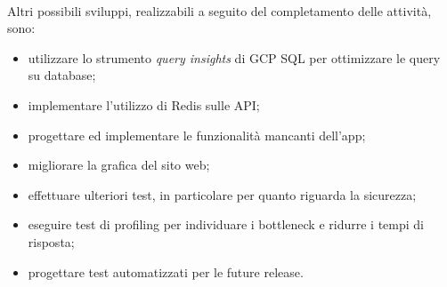 \documentclass[12pt,a4paper,twoside,english,italian]{book}
\begin{document}
\paragraph{} Altri possibili sviluppi, realizzabili a seguito del completamento delle attività, sono:
\begin{itemize}
    \item utilizzare lo strumento \emph{query insights} di GCP SQL per ottimizzare le query su database;
    \item implementare l'utilizzo di Redis sulle API;
    \item progettare ed implementare le funzionalità mancanti dell'app;
    \item migliorare la grafica del sito web;
    \item effettuare ulteriori test, in particolare per quanto riguarda la sicurezza;
    \item eseguire test di profiling per individuare i bottleneck e ridurre i tempi di risposta;
    \item progettare test automatizzati per le future release.
\end{itemize} 

\def\UrlBreaks{\do\/\do-}
\end{document}
